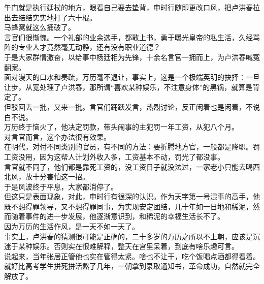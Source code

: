 \begin{multicols}{\theparacolNo}
午门就是执行廷杖的地方，眼看自己要去垫背，申时行随即更改口风，把卢洪春拉出去结结实实地打了六十棍。\\

马蜂窝就这么捅破了。\\

言官们很惭愧。一个礼部的业余选手，都敢上书，勇于曝光皇帝的私生活，久经骂阵的专业人才竟然毫无动静，还有没有职业道德？\\

于是大家群情激奋，以给事中杨廷相为先锋，十余名言官一拥而上，为卢洪春喊冤翻案。\\

面对漫天的口水和奏疏，万历毫不退让，事实上，这是一个极端英明的抉择：一旦让步，从宽处理了卢洪春，那所谓“喜欢某种娱乐，不注意身体”的黑锅，就算是背定了。\\

但驳回去一批，又来一批。言官们踊跃发言，热烈讨论，反正闲着也是闲着，不说白不说。\\

万历终于恼火了，他决定罚款，带头闹事的主犯罚一年工资，从犯八个月。\\

对言官而言，这个办法很有效果。\\

在明代，对付不同类别的官员，有不同的方法：要折腾地方官，一般都是降职。罚工资没用，因为这帮人计划外收入多，工资基本不动，罚光了都没事。\\

言官就不同了，他们都是靠死工资的，没工资日子就没法过，一家老小只能去喝西北风，故十分害怕这一招。\\

于是风波终于平息，大家都消停了。\\

但这只是表面现象，对此，申时行有很深的认识。作为天字第一号混事的高手，他既不想得罪领导，又不想得罪同事，为实现安定团结，几十年如一日地和稀泥，然而随着事件的进一步发展，他逐渐意识到，和稀泥的幸福生活长不了。\\

因为万历的生活作风，是一天不如一天了。\\

事实上，卢洪春的猜测很可能是正确的，二十多岁的万历之所以不上朝，应该是沉迷于某种娱乐。否则实在很难解释，整天在宫里呆着，到底有啥乐趣可言。\\

说起来，当年张居正管他也实在管得太紧。啥也不让干，吃个饭喝点酒都得看着。就好比高考学生拼死拼活熬了几年，一朝拿到录取通知书，革命成功，自然就完全解放了。\\


\end{multicols}
